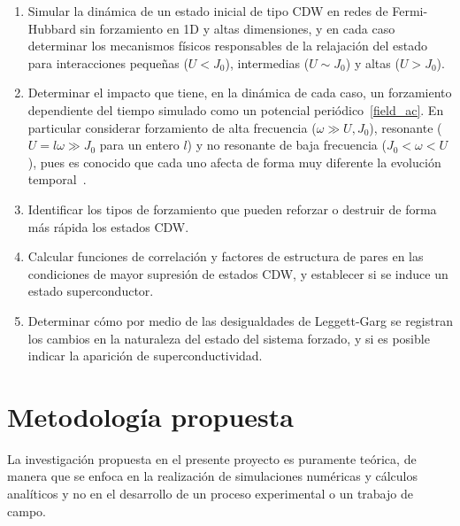 \documentclass[a4paper,10pt]{article}
\begin{document}
\begin{enumerate}
\item Simular la din\'amica de un estado inicial de tipo CDW en redes de Fermi-Hubbard sin forzamiento en 1D y altas dimensiones, y en cada caso determinar los mecanismos f\'isicos responsables de la relajaci\'on del estado para interacciones peque\~nas ($U<J_0$), intermedias ($U\sim J_0$) y altas ($U>J_0$). 
\item Determinar el impacto que tiene, en la din\'amica de cada caso, un forzamiento dependiente del tiempo simulado como un potencial peri\'odico~\eqref{field_ac}. En particular considerar forzamiento de alta frecuencia ($\omega\gg U,J_0$), resonante ($U=l\omega\gg J_0$ para un entero $l$) y no resonante de baja frecuencia ($J_0<\omega<U$), pues es conocido que cada uno afecta de forma muy diferente la evoluci\'on temporal~\cite{bukov2016prl,jonathan2016,tsuji2011prl,mentink2015nat,nosotros2017driven}.  
\item Identificar los tipos de forzamiento que pueden reforzar o destruir de forma m\'as r\'apida los estados CDW.
\item Calcular funciones de correlaci\'on y factores de estructura de pares en las condiciones de mayor supresi\'on de estados CDW, y establecer si se induce un estado superconductor.
\item Determinar c\'omo por medio de las desigualdades de Leggett-Garg se registran los cambios en la naturaleza del estado del sistema forzado, y si es posible indicar la aparici\'on de superconductividad.

\end{enumerate}

\section{Metodolog\'{i}a propuesta}
La investigaci\'on propuesta en el presente proyecto es puramente te\'orica, de manera que se enfoca en la realizaci\'on de simulaciones num\'ericas y c\'alculos anal\'iticos y no en el desarrollo de un proceso experimental o un trabajo de campo. 
\end{document}
